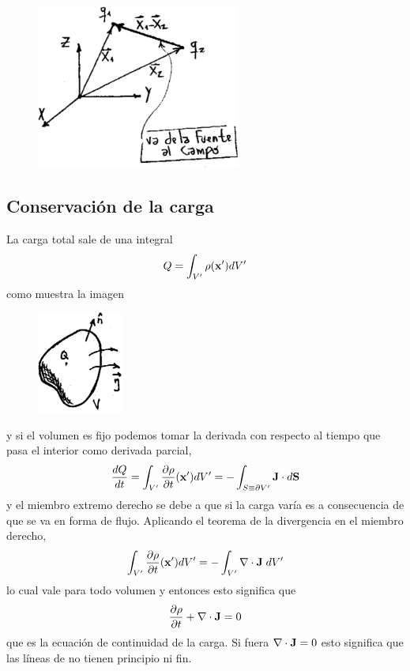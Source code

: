 \documentclass[10pt,oneside]{CBFT_book}
\begin{document}
\begin{figure}[htb]
	\begin{center}
	\includegraphics[width=0.6\textwidth]{images/fig_ft1_ejescargas.pdf}	 
	\end{center}
	\caption{}
\end{figure} 

\subsection{Conservación de la carga}

La carga total sale de una integral 
\[
	Q = \int_{V'}  \rho(\vb{x}') dV'
\]
como muestra la imagen
\begin{figure}[htb]
	\begin{center}
	\includegraphics[width=0.25\textwidth]{images/fig_ft1_conserv.pdf}	 
	\end{center}
	\caption{}
\end{figure} 
y si el volumen es fijo podemos tomar la derivada con respecto al tiempo que pasa el interior como
derivada parcial,
\[
	\dtot{Q}{t} = \int_{V'} \dpar{\rho}{t} (\vb{x}') dV' = - \int_{S\equiv\partial V'} \vb{J} \cdot d\vb{S}
\]
y el miembro extremo derecho  se debe a que si la carga varía es a consecuencia de que se va en
forma de flujo. Aplicando el teorema de la divergencia en el miembro derecho,
\[
	\int_{V'} \dpar{\rho}{t} (\vb{x}') dV' = - \int_{V'} \nabla \cdot \vb{J} \; dV'
\]
lo cual vale para todo volumen y entonces esto significa que
\[
	\dpar{\rho}{t} + \nabla \cdot \vb{J} = 0
\]
que es la ecuación de continuidad de la carga. Si fuera $\nabla \cdot \vb{J}=0$ esto significa que las líneas
de  no tienen principio ni fin.
\end{document}

